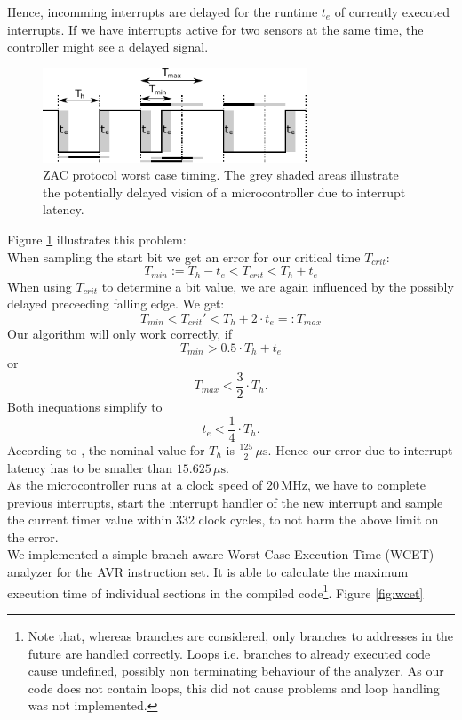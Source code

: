 \documentclass[a4paper]{scrreprt}
\begin{document}
Hence, incomming interrupts are delayed for the runtime $t_e$ of currently executed interrupts.
If we have interrupts active for two sensors at the same time, the controller might see a delayed signal.
\begin{figure}[b]
	\centering
	\includegraphics[width=0.7\textwidth]{img/zac_timing.pdf}
	\caption{ZAC protocol worst case timing. The grey shaded areas illustrate the potentially delayed vision
	of a microcontroller due to interrupt latency.}
	\label{fig:zactiming}
\end{figure}
Figure \ref{fig:zactiming} illustrates this problem:\\
When sampling the start bit we get an error for our critical time $T_{crit}$:
$$T_{min} := T_h - t_e < T_{crit} < T_h + t_e$$
When using $T_{crit}$ to determine a bit value, we are again influenced by the possibly delayed preceeding falling edge. We get:
$$T_{min} < T_{crit}' < T_h + 2 \cdot t_e =: T_{max}$$
Our algorithm will only work correctly, if
$$T_{min} > 0.5\cdot T_h + t_e$$
or
$$T_{max} < \frac{3}{2}\cdot T_h\text{.}$$
Both inequations simplify to
$$t_e < \frac{1}{4}\cdot T_h\text{.}$$
According to \cite{zac}, the nominal value for $T_h$ is $\frac{125}{2}\,\mu\mathrm{s}$. Hence our error due to
interrupt latency has to be smaller than $15.625\,\mu\mathrm{s}$.\\
As the microcontroller runs at a clock speed of $20\,\mathrm{MHz}$, we have to complete previous interrupts,
start the interrupt handler of the new interrupt and sample the current timer value within 332 clock cycles,
to not harm the above limit on the error.\\
We implemented a simple branch aware Worst Case Execution Time (WCET) analyzer for the AVR instruction set.
It is able to calculate the maximum execution time of individual sections in the compiled code\footnote{Note that,
whereas branches are considered, only branches to addresses in the future are handled correctly. Loops i.e.
branches to already executed code cause undefined, possibly non terminating behaviour of the analyzer. As our code
does not contain loops, this did not cause problems and loop handling was not implemented.}. Figure \ref{fig:wcet}
\end{document}
